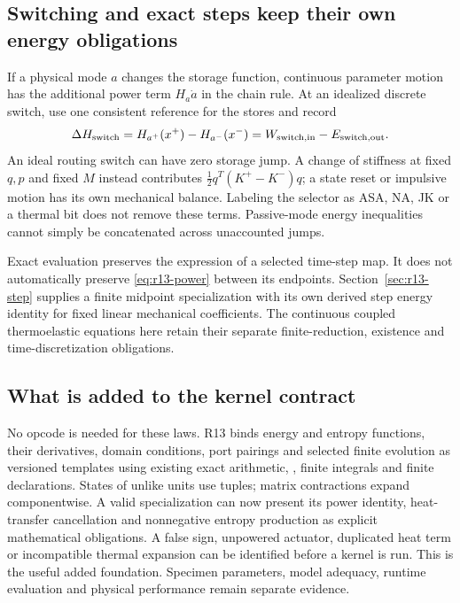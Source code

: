\subsection{Switching and exact steps keep their own energy obligations}
If a physical mode $a$ changes the storage function, continuous parameter
motion has the additional power term $H_a\dot a$ in the chain rule. At an
idealized discrete switch, use one consistent reference for the stores and
record
\begin{equation}
 \Delta H_{\rm switch}=H_{a^+}(x^+)-H_{a^-}(x^-)
       =W_{\rm switch,in}-E_{\rm switch,out}.
 \label{eq:r13-switch}
\end{equation}
An ideal routing switch can have zero storage jump. A change of stiffness at
fixed $q,p$ and fixed $M$ instead contributes
$\tfrac12q^T(K^+-K^-)q$; a state reset or impulsive motion has its own
mechanical balance. Labeling the selector as ASA, NA, JK or a thermal bit
does not remove these terms. Passive-mode energy inequalities cannot simply
be concatenated across unaccounted jumps.

Exact evaluation preserves the expression of a selected time-step map.
It does not automatically preserve \eqref{eq:r13-power} between its endpoints.
Section~\ref{sec:r13-step} supplies a finite midpoint specialization with its
own derived step energy identity for fixed linear mechanical coefficients.
The continuous coupled thermoelastic equations here retain their separate
finite-reduction, existence and time-discretization obligations.

\subsection{What is added to the kernel contract}
No opcode is needed for these laws. R13 binds energy and entropy functions,
their derivatives, domain conditions, port pairings and selected finite
evolution as versioned templates using existing exact arithmetic,
, finite integrals and finite  declarations.
States of unlike units use tuples; matrix contractions expand componentwise.
A valid specialization can now present its power identity, heat-transfer
cancellation and nonnegative entropy production as explicit mathematical
obligations. A false sign, unpowered actuator, duplicated heat term or
incompatible thermal expansion can be identified before a kernel is run.
This is the useful added foundation. Specimen parameters, model adequacy,
runtime evaluation and physical performance remain separate evidence.
